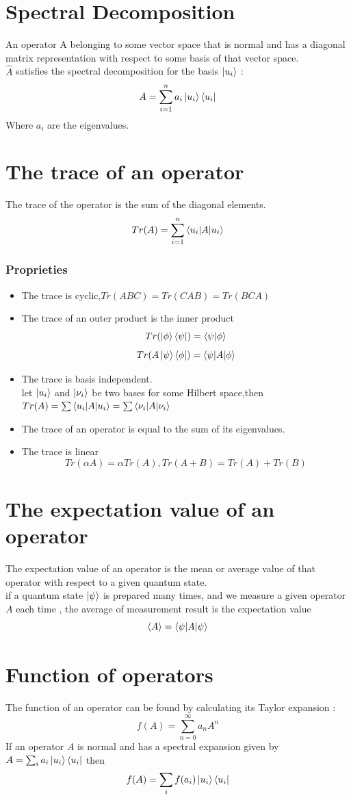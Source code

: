 \documentclass[12pt,oneside]{book}
\begin{document}
\section{Spectral Decomposition}
An operator A belonging to some vector space that is normal and has a diagonal matrix representation with respect to some basis of that vector space.\\
$\hat{A}$ satisfies the spectral decomposition for the basis $\ket{u_i}$ :
\[ A = \sum_{i=1}^n a_i\ket{u_i}\bra{u_i} \]
Where $a_i$ are the eigenvalues.
\section{The trace of an operator}
The trace of the operator is the sum of the diagonal elements.
\[ Tr(A) = \sum_{i=1}^n\braket{u_i|A|u_i} \]
\subsubsection{Proprieties}
\begin{itemize}
    \item The trace is cyclic,$Tr(ABC) = Tr(CAB) = Tr(BCA)$
    \item The trace of an outer product is the inner product
          \[Tr(\ket{\phi}\bra{\psi}) = \braket{\psi|\phi}\]
          \[Tr(A\ket{\psi}\bra{\phi}) = \braket{\psi|A|\phi}\]
    \item The trace is basis independent.\\
          let $\ket{u_i}$ and $\ket{\nu_i}$ be two bases for some Hilbert space,then $Tr(A) = \sum\braket{u_i|A|u_i} = \sum\braket{\nu_i|A|\nu_i}$
    \item The trace of an operator is equal to the sum of its eigenvalues.
    \item The trace is linear
          \[Tr(\alpha A) = \alpha Tr(A),Tr(A+B) = Tr(A) + Tr(B)\]
\end{itemize}
\section{The expectation value of an operator}
The expectation value of an operator is the mean or average value of that operator with respect to a given quantum state.\\
if a quantum state $\ket{\psi}$ is prepared many times, and we measure a given operator $A$ each time , the average of measurement result is the expectation value
\[\langle A \rangle = \braket{\psi|A|\psi} \]
\section{Function of operators}
The function of an operator can be found by calculating its Taylor expansion :
\[ f(A) = \sum_{n=0}^\infty a_n A^n \]
If an operator $A$ is normal and has a spectral expansion given by $A = \sum_i a_i\ket{u_i}\bra{u_i}$ then
\[f(A) = \sum_i f(a_i)\ket{u_i}\bra{u_i}\]
\end{document}

